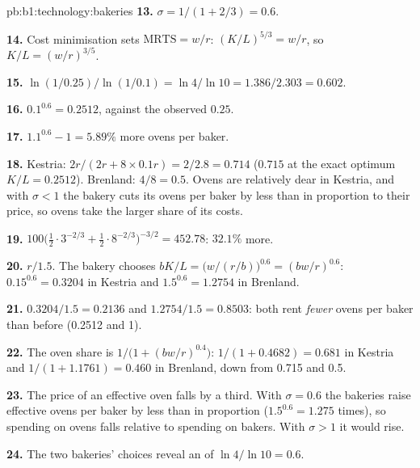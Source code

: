 \begin{solution}{pb:b1:technology:bakeries}
\textbf{13.} $\sigma = 1/(1 + 2/3) = 0.6$.

\textbf{14.} Cost minimisation sets $\mathrm{MRTS} = w/r$:
$(K/L)^{5/3} = w/r$, so $K/L = (w/r)^{3/5}$.

\textbf{15.} $\ln(1/0.25)/\ln(1/0.1) = \ln 4/\ln 10 = 1.386/2.303 = 0.602$.

\textbf{16.} $0.1^{0.6} = 0.2512$, against the observed $0.25$.

\textbf{17.} $1.1^{0.6} - 1 = 5.89\%$ more ovens per baker.

\textbf{18.} Kestria: $2r/(2r + 8 \times 0.1r) = 2/2.8 = 0.714$ ($0.715$ at the exact
optimum $K/L = 0.2512$). Brenland: $4/8 = 0.5$. Ovens are relatively dear in
Kestria, and with $\sigma < 1$ the bakery cuts its ovens per baker by less than
in proportion to their price, so ovens take the larger share of its costs.

\textbf{19.} $100\bigl(\tfrac12 \cdot 3^{-2/3} + \tfrac12 \cdot 8^{-2/3}\bigr)^{-3/2} = 452.78$: $32.1\%$ more.

\textbf{20.} $r/1.5$. The bakery chooses $bK/L = \bigl(w/(r/b)\bigr)^{0.6} = (bw/r)^{0.6}$:
$0.15^{0.6} = 0.3204$ in Kestria and $1.5^{0.6} = 1.2754$ in Brenland.

\textbf{21.} $0.3204/1.5 = 0.2136$ and $1.2754/1.5 = 0.8503$: both rent \emph{fewer}
ovens per baker than before (0.2512 and 1).

\textbf{22.} The oven share is $1/\bigl(1 + (bw/r)^{0.4}\bigr)$: $1/(1 + 0.4682) = 0.681$ in
Kestria and $1/(1 + 1.1761) = 0.460$ in Brenland, down from 0.715 and 0.5.

\textbf{23.} The price of an effective oven falls by a third. With $\sigma = 0.6$
the bakeries raise effective ovens per baker by less than in proportion
($1.5^{0.6} = 1.275$ times), so spending on ovens falls relative to spending on
bakers. With $\sigma > 1$ it would rise.

\textbf{24.} The two bakeries' choices reveal an  of
$\ln 4/\ln 10 = 0.6$.
\end{solution}
